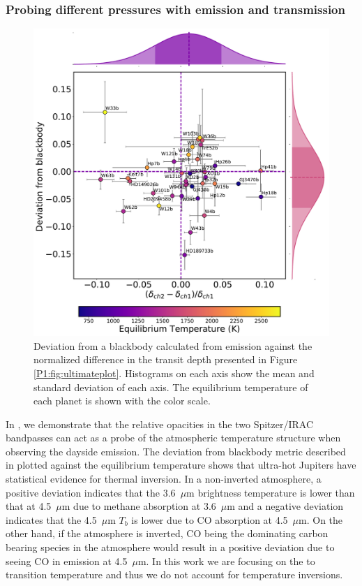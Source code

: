\subsubsection{Probing different pressures with emission and transmission}
\begin{figure}
    \centering
    \includegraphics[width = \linewidth]{TvsE+hist+emily.pdf}
    \caption{Deviation from a blackbody calculated from emission against the normalized difference in the transit depth presented in Figure \ref{P1:fig:ultimateplot}. Histograms on each axis show the mean and standard deviation of each axis. The equilibrium temperature of each planet is shown with the color scale.}
    \label{P1:fig:TvsE}
\end{figure}

In \citet{Baxter2020}, we demonstrate that the relative opacities in the two Spitzer/IRAC bandpasses can act as a probe of the atmospheric temperature structure when observing the dayside emission. The deviation from blackbody metric described in \citet{Baxter2020} plotted against the equilibrium temperature shows that ultra-hot Jupiters have statistical evidence for thermal inversion. In a non-inverted atmosphere, a positive deviation indicates that the 3.6~$\mu$m brightness temperature is lower than that at 4.5~$\mu$m due to methane absorption at 3.6~$\mu$m and a negative deviation indicates that the 4.5~$\mu$m $T_b$ is lower due to CO absorption at 4.5~$\mu$m. On the other hand, if the atmosphere is inverted, CO being the dominating carbon bearing species in the atmosphere would result in a positive deviation due to seeing CO in emission at 4.5~$\mu$m. In this work we are focusing on the  to  transition temperature and thus we do not account for temperature inversions.

